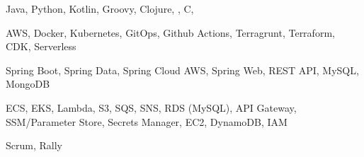 
\begin{cvskills}

    {Java, Python, Kotlin, Groovy, Clojure, \CS{}, C, \CC{}} %

    {AWS, Docker, Kubernetes, GitOps, Github Actions, Terragrunt, Terraform, CDK, Serverless} %

    {Spring Boot, Spring Data, Spring Cloud AWS, Spring Web, REST API, MySQL, MongoDB} %

    {ECS, EKS, Lambda, S3, SQS, SNS, RDS (MySQL), API Gateway, SSM/Parameter Store, Secrets Manager, EC2, DynamoDB, IAM}

    {Scrum, Rally} %

\end{cvskills}
